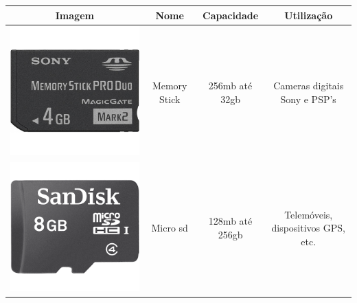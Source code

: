 \documentclass[a4paper]{report}
\begin{document}
\vspace{8mm}

\begin{tabular}{|c|c|c|c|}
\hline
\large\textbf{Imagem} & \large\textbf{Nome} & \large\textbf{Capacidade} & \large\textbf{Utilização}\\\hline
\includegraphics[scale=0.2]{Imagens/4-5-1.png} & Memory Stick & 256\ac{mb} até 32\ac{gb} & Cameras digitais Sony e PSP’s\\\hline
\includegraphics[scale=0.1]{Imagens/4-5-2.png} & Micro \ac{sd} & 128\ac{mb} até 256\ac{gb} & Telemóveis, dispositivos GPS, etc.\\\hline 

\end{tabular}
\end{document}
